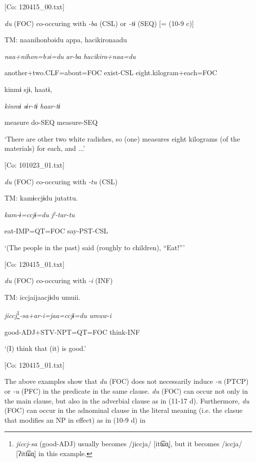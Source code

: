     [Co: 120415\_00.txt]

  \ex \textit{du} (FOC) co-occuring with \textit{{}-ba} (CSL) or \textit{-tɨ} (SEQ) [= (10-9 c)]

  TM:  naa{\textbar}nihon{\textbar}bəidu  appa,  {\textbar}hacikiro{\textbar}naadu

    \textit{naa+nihon=bəi=du}  \textit{ar-ba}  \textit{hacikiro+naa=du}

    another+two.CLF=about=FOC  exist-CSL  eight.kilogram+each=FOC

    kinmɨ  sjɨ,  haatɨ,

    \textit{kinmɨ}  \textit{sɨr-tɨ}  \textit{haar-tɨ}

    measure  do-SEQ  measure-SEQ

    ‘There are other two white radishes, so (one) measures eight kilograms (of the materials) for each, and ...’

    [Co: 101023\_01.txt]

  \ex \textit{du} (FOC) co-occuring with \textit{{}-tu} (CSL)

  TM:  kamɨccjɨdu  jutattu.

    \textit{kam-ɨ=ccjɨ=du}  \textit{jˀ-tar-tu}

    eat-IMP=QT=FOC  say-PST-CSL

    ‘(The people in the past) said (roughly to children), “Eat!”’

    [Co: 120415\_01.txt]

  \ex \textit{du} (FOC) co-occuring with \textit{{}-i} (INF)

  TM:  iccjaijaacjɨdu  umuii.

    \textit{jiccj}\footnote{\textit{jiccj-sa} (good-ADJ) usually becomes /jiccja/ [itt͡ɕɑ̟], but it becomes /iccja/ [ʔitt͡ɕɑ̟] in this example.}\textit{{}-sa+ar-i=jaa=ccjɨ=du  umuw-i}

    good-ADJ+STV-NPT=QT=FOC  think-INF

    ‘(I) think that (it) is good.’

    [Co: 120415\_01.txt]
\z
\z

The above examples show that \textit{du} (FOC) does not necessarily induce \textit{{}-n} (PTCP) or \textit{{}-u} (PFC) in the predicate in the same clause. \textit{du} (FOC) can occur not only in the main clause, but also in the adverbial clause as in (11-17 d). Furthermore, \textit{du} (FOC) can occur in the adnominal clause in the literal meaning (i.e. the clasue that modifies an NP in effect) as in (10-9 d) in 

